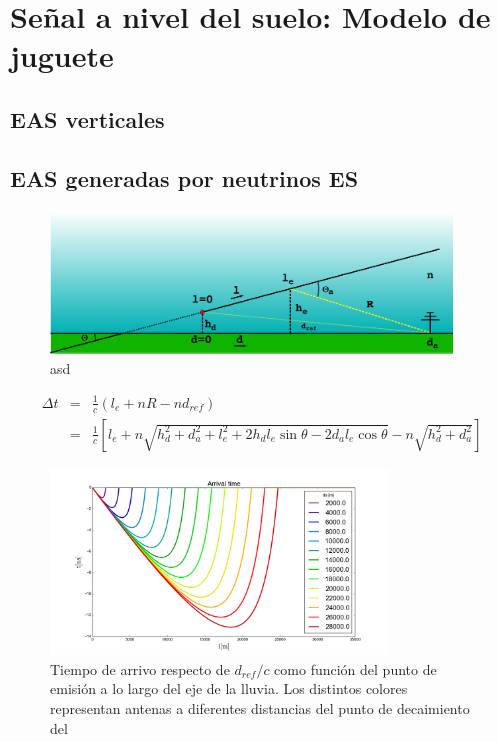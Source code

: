 \section{Se\~nal a nivel del suelo: Modelo de juguete}

	\subsection{EAS verticales}

	\subsection{EAS generadas por neutrinos ES}
	
	\begin{figure}[ht!]
		\centering
		\includegraphics[width=0.95\textwidth]{./fig/EASRadio/timeDelaySchema}
		\caption{\label{fig:esRadio_schema}
		asd
		}
	\end{figure}
	
	\begin{equation}
	\begin{array}{rcl}
	\Delta t & = & \frac{1}{c}\left(l_e+nR-nd_{ref}\right) \\
	 & =  & 
	 \frac{1}{c}\left[l_e +
		n \sqrt{h_d^2+d_a^2+l_e^2+2h_dl_e \sin\theta - 2d_al_e\cos\theta} 
		-
		n \sqrt{h_d^2+d_a^2}
		\right]
	 
	\end{array}
	\end{equation}
	
	\begin{figure}[ht!]
		\centering
		\includegraphics[width=0.8\textwidth]{./fig/EASRadio/timeDelay_at}
		\caption{\label{fig:timeDelay_at}
		Tiempo de arrivo respecto de $d_{ref}/c$ como funci\'on del punto de emisi\'on a lo largo del eje de la lluvia. Los distintos colores representan antenas a diferentes distancias del punto de decaimiento del \tauon{} 
		}
	\end{figure}
	
